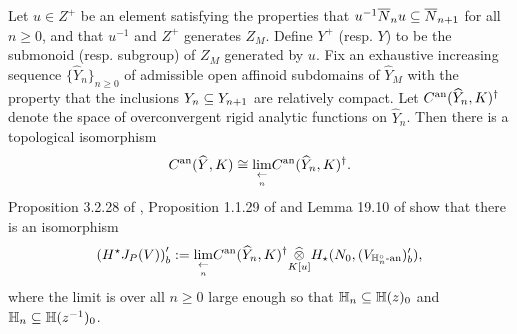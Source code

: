 \documentclass[10pt]{amsart}
\begin{document}
Let $u\in Z^{+}$ be an element satisfying the properties that $u^{-1}\overline{N}_{n}u\subseteq \overline{N}_{n+1}$ for all $n\geq 0$, and that $u^{-1}$ and $Z^{+}$ generates $Z_{M}$. Define $Y^{+}$ (resp. $Y$) to be the submonoid (resp. subgroup) of $Z_{M}$ generated by $u$. Fix an exhaustive increasing sequence $\{\widehat{Y}_{n}\}_{n\geq0}$ of admissible open affinoid subdomains of $\widehat{Y}_{M}$ with the property that the inclusions $Y_{n}\subseteq Y_{n+1}$ are relatively compact. Let $C^{\textnormal{an}}(\widehat{Y}_{n},K)^{\dagger}$ denote the space of overconvergent rigid analytic functions on $\widehat{Y}_{n}$. Then there is a topological isomorphism \begin{equation}\label{eqn:C(Z)=limC(Zn)}
    C^{\textnormal{an}}(\widehat{Y},K) \cong \underset{\underset{n}{\leftarrow}}{\lim}C^{\textnormal{an}}(\widehat{Y}_{n},K)^{\dagger}.
\end{equation} Proposition 3.2.28 of \cite{Jacquet1}, Proposition 1.1.29 of \cite{analytic} and Lemma 19.10 of \cite{Schneider_nfs} show that there is an isomorphism \begin{equation}\label{eqn:HJp(V)_H}
    \left(H^{\star}J_{P}(V)\right)^{\prime}_{b} := \underset{\underset{n}{\leftarrow}}{\lim} C^{\textnormal{an}}(\widehat{Y}_{n},K)^{\dagger}\underset{K[u]}{\widehat{\otimes}} H_{\star}(N_{0},(V_{\mathbb{H}_{n}^{\circ}\textnormal{-an}})^{\prime}_{b}),
\end{equation} where the limit is over all $n\geq 0$ large enough so that $\mathbb{H}_{n}\subseteq \mathbb{H}(z)_{0}$ and $\mathbb{H}_{n}\subseteq \mathbb{H}(z^{-1})_{0}$. 
\end{document}
